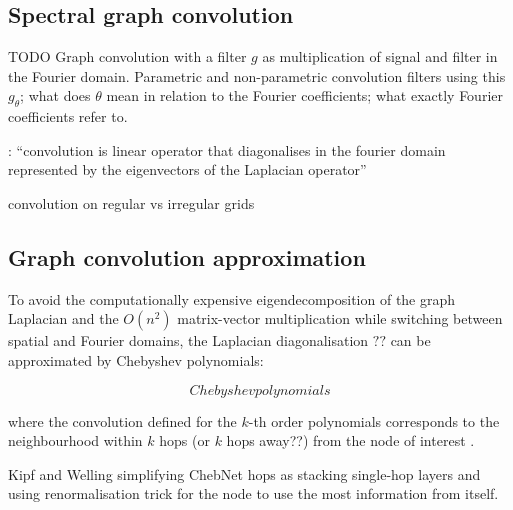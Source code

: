 

\subsection{Spectral graph convolution}


TODO Graph convolution with a filter $g$ as multiplication of signal and filter in the Fourier domain. Parametric and non-parametric convolution filters using this $g_\theta$; what does $\theta$ mean in relation to the Fourier coefficients; what exactly Fourier coefficients refer to.

\cite{defferrard2016convolutional}: ``convolution is linear operator that diagonalises in the fourier domain represented by the eigenvectors of the Laplacian operator''

convolution on regular vs irregular grids

\subsection{Graph convolution approximation}
To avoid the computationally expensive eigendecomposition of the graph Laplacian and the $O(n^2)$ matrix-vector multiplication while switching between spatial and Fourier domains, the Laplacian diagonalisation $??$ can be approximated by Chebyshev polynomials:


\begin{equation}
    Chebyshev polynomials
\end{equation}

where the convolution defined for the $k$-th order polynomials corresponds to the neighbourhood within $k$ hops (or $k$ hops away??) from the node of interest \cite{defferrard2016convolutional}.

Kipf and Welling \cite{kipf2017semi} simplifying ChebNet hops as stacking single-hop layers and using renormalisation trick for the node to use the most information from itself. 


